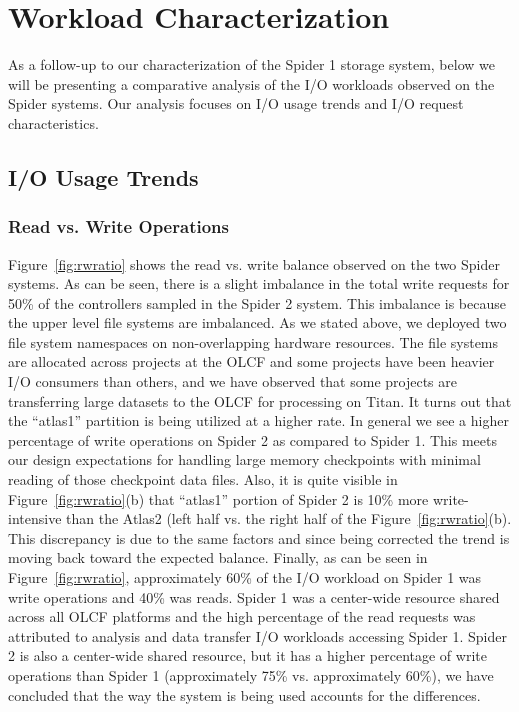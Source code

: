 \section{Workload Characterization}
\label{sec:workloadchar}

As a follow-up to our characterization of the Spider 1 storage system, below we
will be presenting a comparative analysis of the I/O workloads observed on the
Spider systems. Our analysis focuses on I/O usage trends and I/O request
characteristics.


\subsection{I/O Usage Trends}

\subsubsection{Read vs. Write Operations}


Figure~\ref{fig:rwratio} shows the read vs. write balance observed on the two
Spider systems.  As can be seen, there is a slight imbalance in the total write
requests for 50\% of the controllers sampled in the Spider 2 system. This
imbalance is because the upper level file systems are imbalanced. As we stated
above, we deployed two file system namespaces on  non-overlapping hardware
resources. The file systems are allocated across projects at the OLCF and some
projects have been heavier I/O consumers than others, and we have observed 
that some projects are transferring large datasets to the OLCF for processing 
on Titan. It turns out that the ``atlas1'' partition is being utilized at a 
higher rate.  In general we see a higher percentage of write operations on 
Spider 2 as compared to Spider 1. This meets our design expectations for 
handling large memory checkpoints with  minimal reading of those checkpoint 
data files. Also, it is quite visible in Figure~\ref{fig:rwratio}(b)
that ``atlas1'' portion of Spider 2 is 10\% more write-intensive than the
Atlas2 (left half vs. the right half of the Figure~\ref{fig:rwratio}(b). 
This discrepancy is due to the same factors and since being corrected the 
trend is moving back toward the expected balance. Finally, as can be seen 
in Figure~\ref{fig:rwratio}, approximately 60\% of the I/O workload on 
Spider 1 was write operations and 40\% was reads. Spider 1 was a center-wide 
resource shared across all OLCF platforms and the high percentage of the read 
requests was attributed to analysis and data transfer I/O workloads accessing 
Spider 1. Spider 2 is also a center-wide shared resource, but it has a higher 
percentage of write operations than Spider 1 (approximately 75\% vs. 
approximately 60\%), we have concluded that the way the system is being 
used accounts for the differences.  

